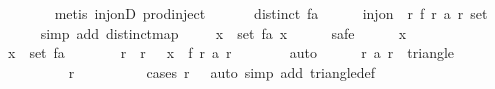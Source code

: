 \begin{isabellebody}
\ \ \ \ \ \ \isamarkupfalse%
\ {\isacharparenleft}metis\ inj{\isacharunderscore}onD\ prod{\isachardot}inject{\isacharparenright}\isanewline
\ \ \isamarkupfalse%
\isanewline
\isanewline
\ \ \isamarkupfalse%
\ {\isachardoublequoteopen}distinct\ {\isacharquery}fa{\isachardoublequoteclose}\isanewline
\ \ \ \ \isamarkupfalse%
\ {\isacharbackquoteopen}inj{\isacharunderscore}on\ {\isacharparenleft}{\isasymlambda}\ r{\isachardot}\ f\ r\ {\isacharparenleft}a\ r{\isacharparenright}{\isacharparenright}\ {\isacharparenleft}set\ {\isacharbrackleft}{}{\isachardot}{\isachardot}{\isacharless}{}{}{}{}{\isacharbrackright}{\isacharparenright}{\isacharbackquoteclose}\isanewline
\ \ \ \ \isamarkupfalse%
\ {\isacharparenleft}simp\ add{\isacharcolon}\ distinct{\isacharunderscore}map{\isacharparenright}\isanewline
\isanewline
\ \ \isamarkupfalse%
\ {\isachardoublequoteopen}{\isasymforall}\ x\ {\isasymin}\ set\ {\isacharquery}fa{\isachardot}\ x\ {\isachargreater}\ {}{\isachardoublequoteclose}\isanewline
\ \ \isamarkupfalse%
\ safe\isanewline
\ \ \ \ \isamarkupfalse%
\ x\isanewline
\ \ \ \ \isamarkupfalse%
\ {\isachardoublequoteopen}x\ {\isasymin}\ set\ {\isacharquery}fa{\isachardoublequoteclose}\isanewline
\ \ \ \ \isamarkupfalse%
\ \isamarkupfalse%
\ r\ \ {\isachardoublequoteopen}r\ {\isacharless}\ {}{}{}{}{\isachardoublequoteclose}\ {\isachardoublequoteopen}x\ {\isacharequal}\ f\ r\ {\isacharparenleft}a\ r{\isacharparenright}{\isachardoublequoteclose}\isanewline
\ \ \ \ \ \ \isamarkupfalse%
\ auto\isanewline
\isanewline
\ \ \ \ \isamarkupfalse%
\ {\isachardoublequoteopen}{\isacharparenleft}r{\isacharcomma}\ a\ r{\isacharparenright}\ {\isasymin}\ triangle\ {}\ {}\ {}{}{}{}{\isachardoublequoteclose}\isanewline
\ \ \ \ \ \ \isamarkupfalse%
\ {\isacharasterisk}{\isacharparenleft}{}{\isacharparenright}\ {\isacharasterisk}{\isacharparenleft}{}{\isacharparenright}\ {\isacharbackquoteopen}r\ {\isacharless}\ {}{}{}{}{\isacharbackquoteclose}\isanewline
\ \ \ \ \ \ \isamarkupfalse%
\ {\isacharparenleft}cases\ {\isachardoublequoteopen}r\ {\isacharequal}\ {}{\isachardoublequoteclose}{\isacharcomma}\ auto\ simp\ add{\isacharcolon}\ triangle{\isacharunderscore}def{\isacharparenright}\isanewline

\end{isabellebody}
